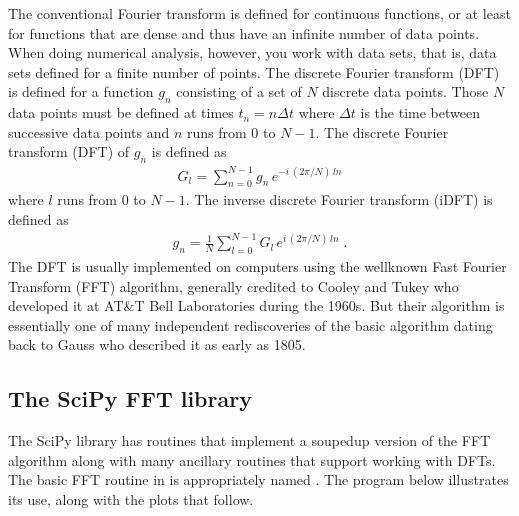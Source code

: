 \documentclass[letterpaper,10pt,english]{sphinxmanual}
\begin{document}
\sphinxAtStartPar
The conventional Fourier transform is defined for continuous functions, or at least for functions that are dense and thus have an infinite number of data points.  When doing numerical analysis, however, you work with  data sets, that is, data sets defined for a finite number of points.  The discrete Fourier transform (DFT) is defined for a function \(g_n\) consisting of a set of \(N\) discrete data points.  Those \(N\) data points must be defined at  times \(t_n=n\Delta t\) where \(\Delta t\) is the time between successive data points and \(n\) runs from 0 to \(N-1\).  The discrete Fourier transform (DFT) of \(g_n\) is defined as
\begin{equation}\label{equation:chap9/chap9_scipy:eq:DFT}
\begin{split}G_l = \sum_{n=0}^{N-1} g_n\, e^{-i\,(2\pi/N)\,ln}\end{split}
\end{equation}
\sphinxAtStartPar
where \(l\) runs from 0 to \(N-1\).  The inverse discrete Fourier transform (iDFT) is defined as
\begin{equation}\label{equation:chap9/chap9_scipy:eq:iDFT}
\begin{split}g_n = \frac{1}{N} \sum_{l=0}^{N-1} G_l\, e^{i\,(2\pi/N)\,ln} \;.\end{split}
\end{equation}
\sphinxAtStartPar
The DFT is usually implemented on computers using the well\sphinxhyphen{}known Fast Fourier Transform (FFT) algorithm, generally credited to Cooley and Tukey who developed it at AT\&T Bell Laboratories during the 1960s.  But their algorithm is essentially one of many independent rediscoveries of the basic algorithm dating back to Gauss who described it as early as 1805.


\subsection{The SciPy FFT library}
\label{\detokenize{chap9/chap9_scipy:the-scipy-fft-library}}
\sphinxAtStartPar
The SciPy library  has routines that implement a souped\sphinxhyphen{}up version of the FFT algorithm along with many ancillary routines that support working with DFTs.  The basic FFT routine in  is appropriately named .  The program below illustrates its use, along with the plots that follow.
\end{document}
